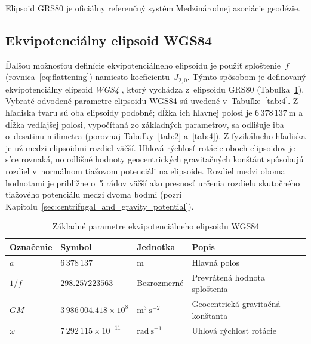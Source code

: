 \documentclass[a4paper,12pt]{book}
\begin{document}
Elipsoid GRS80 je oficiálny referenčný systém Medzinárodnej asociácie geodézie.






\subsection{Ekvipotenciálny elipsoid WGS84}
\label{sec:wgs84}

Ďalšou možnosťou definície ekvipotenciálneho elipsoidu je použiť sploštenie~$f$ 
(rovnica~\ref{eq:flattening}) namiesto koeficientu~$J_{2,0}$.  Týmto spôsobom 
je definovaný ekvipotenciálny elipsoid \emph{WGS4} 
\parencite[angl. \textit{World Geodetic System~1984};][]{WGS84}, ktorý vychádza 
z~elipsoidu GRS80 (Tabuľka~\ref{tab:3}).  Vybraté odvodené parametre elipsoidu 
WGS84 sú uvedené v~Tabuľke~\ref{tab:4}.  Z hľadiska tvaru sú oba elipsoidy 
podobné; dĺžka ich hlavnej polosi je $6\, 378\, 137\ \mathrm{m}$ a dĺžka 
vedľajšej polosi, vypočítaná zo základných parametrov, sa odlišuje iba 
o~desatinu milimetra (porovnaj Tabuľky~\ref{tab:2} a~\ref{tab:4}).  
Z fyzikálneho hľadiska je už medzi elipsoidmi rozdiel väčší.  Uhlová rýchlosť 
rotácie oboch elipsoidov je síce rovnaká, no odlišné hodnoty geocentrických 
gravitačných konštánt spôsobujú rozdiel v~normálnom tiažovom potenciáli na 
elipsoide.  Rozdiel medzi oboma hodnotami je približne o~5 rádov väčší ako 
presnosť určenia rozdielu skutočného tiažového potenciálu medzi dvoma bodmi 
(pozri Kapitolu~\ref{sec:centrifugal_and_gravity_potential}).

\begin{table}
\begin{center}
\caption{Základné parametre ekvipotenciálneho elipsoidu WGS84}
\label{tab:3}
\small
\begin{tabular}{l l l l}
\hline
Označenie & Symbol & Jednotka & Popis\\
\hline
$a$       & $6\,378\,137$ & m & Hlavná polos\\
$1 \slash f$ & $298.257223563$ & Bezrozmerné & Prevrátená hodnota sploštenia\\
$GM$ & $3\,986\,004.418 \times 10^8$ & $\mathrm{m}^3 \ \mathrm{s}^{-2}$ 
& Geocentrická gravitačná konštanta\\
$\omega$ & $7\,292\,115 \times 10^{-11}$ & $\mathrm{rad} \ \mathrm{s}^{-1}$ 
& Uhlová rýchlosť rotácie\\
\hline
\end{tabular}
\end{center}
\end{table}
\end{document}
